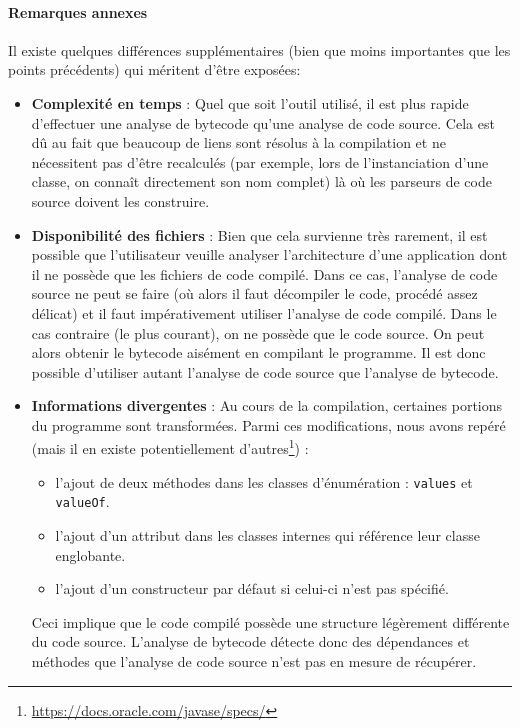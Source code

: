 \documentclass{scrartcl}
\begin{document}
        \paragraph{Remarques annexes}Il existe quelques différences supplémentaires (bien que moins importantes que les points précédents) qui méritent d'être exposées:
        \begin{itemize}
        	\item\textbf{Complexité en temps} : Quel que soit l'outil utilisé, il est plus rapide d'effectuer une analyse de bytecode qu'une analyse de code source. Cela est dû au fait que beaucoup de liens sont résolus à la compilation et ne nécessitent pas d'être recalculés (par exemple, lors de l'instanciation d'une classe, on connaît directement son nom complet) là où les parseurs de code source doivent les construire.
        	\item\textbf{Disponibilité des fichiers} : Bien que cela survienne très rarement, il est possible que l'utilisateur veuille analyser l'architecture d'une application dont il ne possède que les fichiers de code compilé. Dans ce cas, l'analyse de code source ne peut se faire (où alors il faut décompiler le code, procédé assez délicat) et il faut impérativement utiliser l'analyse de code compilé. Dans le cas contraire (le plus courant), on ne possède que le code source. On peut alors obtenir le bytecode aisément en compilant le programme. Il est donc possible d'utiliser autant l'analyse de code source que l'analyse de bytecode.
        	\item\textbf{Informations divergentes} : Au cours de la compilation, certaines portions du programme sont transformées. Parmi ces modifications, nous avons repéré (mais il en existe potentiellement d'autres\footnote{\url{https://docs.oracle.com/javase/specs/}}) :
        	\begin{itemize}
        	    \item l'ajout de deux méthodes dans les classes d'énumération : \texttt{values} et \texttt{valueOf}.
        	    \item l'ajout d'un attribut dans les classes internes qui référence leur classe englobante.
        	    \item l'ajout d'un constructeur par défaut si celui-ci n'est pas spécifié.
        	\end{itemize}
        	Ceci implique que le code compilé possède une structure légèrement différente du code source. L'analyse de bytecode détecte donc des dépendances et méthodes que l'analyse de code source n'est pas en mesure de récupérer.
        \end{itemize}
       
\end{document}
